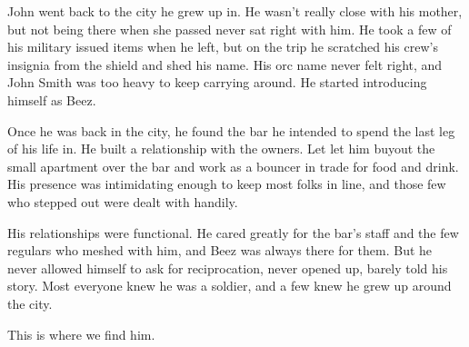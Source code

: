 John went back to the city he grew up in.
He wasn't really close with his mother, but not being there when she passed never sat right with him.
He took a few of his military issued items when he left, but on the trip he scratched his crew's insignia from the shield and shed his name.
His orc name never felt right, and John Smith was too heavy to keep carrying around.
He started introducing himself as Beez.

Once he was back in the city, he found the bar he intended to spend the last leg of his life in.
He built a relationship with the owners.
Let let him buyout the small apartment over the bar and work as a bouncer in trade for food and drink.
His presence was intimidating enough to keep most folks in line, and those few who stepped out were dealt with handily.

His relationships were functional.
He cared greatly for the bar's staff and the few regulars who meshed with him, and Beez was always there for them.
But he never allowed himself to ask for reciprocation, never opened up, barely told his story.
Most everyone knew he was a soldier, and a few knew he grew up around the city.

This is where we find him.


